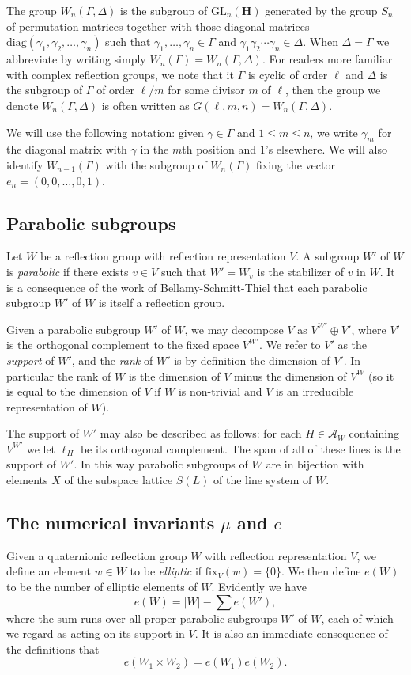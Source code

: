 \documentclass[11pt, reqno]{amsart}
\numberwithin{equation}{section}
\theoremstyle{definition}
\theoremstyle{plain}
\newcommand{\HH}{\mathbf{H}}
\begin{document}
The group $W_n(\Gamma,\Delta)$ is the subgroup of $\mathrm{GL}_n(\HH)$ generated by the group $S_n$ of permutation matrices together with those diagonal matrices $\mathrm{diag}(\gamma_1,\gamma_2,\dots,\gamma_n)$ such that $\gamma_1,\dots,\gamma_n \in \Gamma$ and $\gamma_1 \gamma_2 \cdots \gamma_n \in \Delta$. When $\Delta=\Gamma$ we abbreviate by writing simply $W_n(\Gamma)=W_n(\Gamma,\Delta)$. For readers more familiar with complex reflection groups, we note that it $\Gamma$ is cyclic of order $\ell$ and $\Delta$ is the subgroup of $\Gamma$ of order $\ell/m$ for some divisor $m$ of $\ell$, then the group we denote $W_n(\Gamma,\Delta)$ is often written as $G(\ell,m,n)=W_n(\Gamma,\Delta)$. 

We will use the following notation: given $\gamma \in \Gamma$ and $1 \leq m \leq n$, we write $\gamma_m$ for the diagonal matrix with $\gamma$ in the $m$th position and $1$'s elsewhere. We will also identify $W_{n-1}(\Gamma)$ with the subgroup of $W_n(\Gamma)$ fixing the vector $e_n=(0,0,\dots,0,1)$. 

\subsection{Parabolic subgroups} Let $W$ be a reflection group with reflection representation $V$. A subgroup $W'$ of $W$ is \emph{parabolic} if there exists $v \in V$ such that $W'=W_v$ is the stabilizer of $v$ in $W$. It is a consequence of the work \cite{BST}of Bellamy-Schmitt-Thiel that each parabolic subgroup $W'$ of $W$ is itself a reflection group. 

Given a parabolic subgroup $W'$ of $W$, we may decompose $V$ as $V^{W'} \oplus V'$, where $V'$ is the orthogonal complement to the fixed space $V^{W'}$. We refer to $V'$ as the \emph{support} of $W'$, and the \emph{rank} of $W'$ is by definition the dimension of $V'$. In particular the rank of $W$ is the dimension of $V$ minus the dimension of $V^W$ (so it is equal to the dimension of $V$ if $W$ is non-trivial and $V$ is an irreducible representation of $W$). 

The support of $W'$ may also be described as follows: for each $H \in \mathcal{A}_W$ containing $V^{W'}$ we let $\ell_H$ be its orthogonal complement. The span of all of these lines is the support of $W'$. In this way parabolic subgroups of $W$ are in bijection with elements $X$ of the subspace lattice $S(L)$ of the line system of $W$.

\subsection{The numerical invariants $\mu$ and $e$} Given a quaternionic reflection group $W$ with reflection representation $V$, we define an element $w \in W$ to be \emph{elliptic} if $\mathrm{fix}_V(w)=\{ 0 \}$. We then define $e(W)$ to be the number of elliptic elements of $W$. Evidently we have
$$e(W)=|W|-\sum e(W'),$$ where the sum runs over all proper parabolic subgroups $W'$ of $W$, each of which we regard as acting on its support in $V$. It is also an immediate consequence of the definitions that $$e(W_1 \times W_2)=e(W_1) e(W_2).$$
\end{document}
